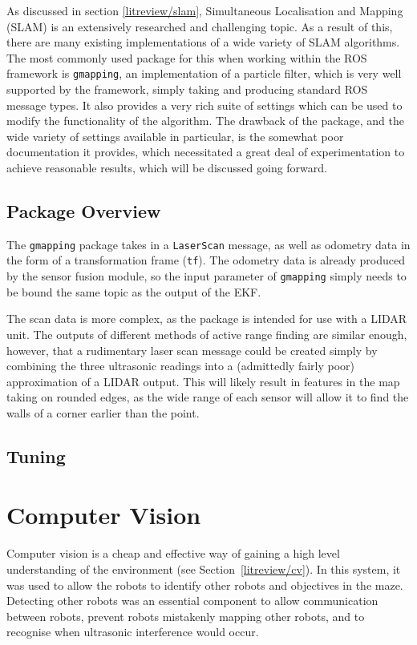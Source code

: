 As discussed in section \ref{litreview/slam}, Simultaneous Localisation and Mapping (SLAM) is an extensively researched and challenging topic. As a result of this, there are many existing implementations of a wide variety of SLAM algorithms. The most commonly used package for this when working within the ROS framework is \verb|gmapping|, an implementation of a particle filter, which is very well supported by the framework, simply taking and producing standard ROS message types. It also provides a very rich suite of settings which can be used to modify the functionality of the algorithm. The drawback of the package, and the wide variety of settings available in particular, is the somewhat poor documentation it provides, which necessitated a great deal of experimentation to achieve reasonable results, which will be discussed going forward.

\subsection{Package Overview}\label{soft/SLAM/package}

The \verb|gmapping| package takes in a \verb|LaserScan| message, as well as odometry data in the form of a transformation frame (\verb|tf|). The odometry data is already produced by the sensor fusion module, so the input parameter of \verb|gmapping| simply needs to be bound the same topic as the output of the EKF.

The scan data is more complex, as the package is intended for use with a LIDAR unit. The outputs of different methods of active range finding are similar enough, however, that a rudimentary laser scan message could be created simply by combining the three ultrasonic readings into a (admittedly fairly poor) approximation of a LIDAR output. This will likely result in features in the map taking on rounded edges, as the wide range of each sensor will allow it to find the walls of a corner earlier than the point.



\subsection{Tuning}\label{soft/SLAM/tuning}

\section{Computer Vision}\label{soft/cv}
Computer vision is a cheap and effective way of gaining a high level
understanding of the environment (see Section~\ref{litreview/cv}). In this system, it was used to allow the robots to
identify other robots and objectives in the maze. Detecting other
robots was an essential component to allow communication between robots,
prevent robots mistakenly mapping other robots, and to recognise when
ultrasonic interference would occur.

